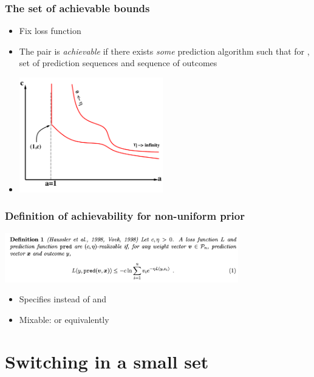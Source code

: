 \documentclass{beamer}
\begin{document}
\begin{frame}
\frametitle{The set of achievable bounds}
\begin{itemize}
\item 
Fix loss function \R{$\lambda: \Omega \times \Gamma \to [0,\infty)$}
\item
The pair  is {\em achievable} if there exists 
{\em some} prediction algorithm
such that for  ,  set of  prediction
sequences and  sequence of outcomes
\item
\begin{center}
\includegraphics[height=5cm]{figures/achievable2.pdf}
\end{center}
\end{itemize}
\end{frame}

\begin{frame}
  \frametitle{Definition of achievability for non-uniform prior}
  \includegraphics[width=4in]{FromPaper/VovkForNonUniformPrior.png}
  \begin{itemize}
    \item Specifies  instead of  and
    \item Mixable:  or equivalently 
  \end{itemize}
\end{frame}

\section{Switching in a small set}
\end{document}
